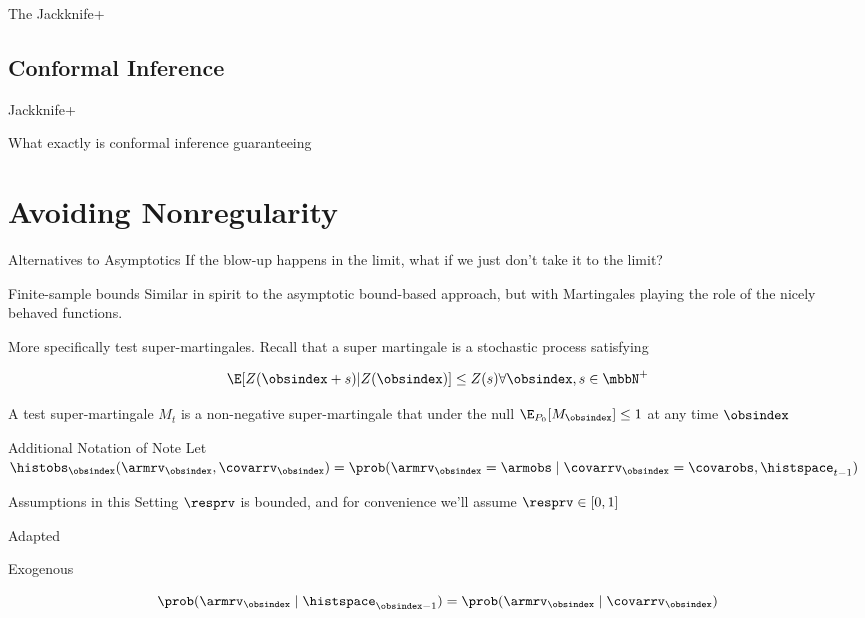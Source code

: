 \documentclass[aspectratio=169, professionalfonts]{beamer}
\begin{document}
\begin{frame}{The Jackknife+}
\end{frame}

\subsection{Conformal Inference}
\begin{frame}{Jackknife+}
\end{frame}
\begin{frame}{What exactly is conformal inference guaranteeing}
\end{frame}
\section{Avoiding Nonregularity}
\begin{frame}{Alternatives to Asymptotics}
	If the blow-up happens in the limit, what if we just don't take it to the limit?
\end{frame}

\begin{frame}{Finite-sample bounds}
	Similar in spirit to the asymptotic bound-based approach, but with Martingales
	playing the role of the nicely behaved functions.

	More specifically test super-martingales. Recall that a super martingale is
	a stochastic process satisfying

	$$\E[Z(\obsindex + s) | Z(\obsindex)] \leq Z(s) \forall \obsindex, s \in \mbbN^+$$

	A test super-martingale $M_t$ is a non-negative super-martingale that under
	the null $\E_{P_0}[M_\obsindex] \leq 1$ at any time $\obsindex$
\end{frame}

\begin{frame}{Additional Notation of Note}
	Let $\histobs_{\obsindex}(\armrv_{\obsindex}, \covarrv_{\obsindex}) =
		\prob(\armrv_{\obsindex} = \armobs \mid \covarrv_{\obsindex} = \covarobs, \histspace_{t-1})$
\end{frame}

\begin{frame}{Assumptions in this Setting}
	$\resprv$ is bounded, and for convenience we'll assume $\resprv \in [0,1]$


	Adapted

	Exogenous

	$$\prob(\armrv_{\obsindex} \mid \histspace_{\obsindex - 1}) =
		\prob(\armrv_{\obsindex} \mid \covarrv_{\obsindex})$$
\end{frame}
\end{document}
